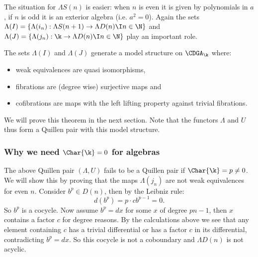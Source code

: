 The situation for $\Lambda S(n)$ is easier: when $n$ is even it is given by polynomials in $a$, if $n$ is odd it is an exterior algebra (i.e. $a^2 = 0$). Again the sets $\Lambda(I) = \{ \Lambda(i_n) : \Lambda S(n+1) \to \Lambda D(n) \I n \in \N\}$ and $\Lambda(J) = \{ \Lambda(j_n) : \k \to \Lambda D(n) \I n \in \N\}$ play an important role.

\begin{theorem}
	The sets $\Lambda(I)$ and $\Lambda(J)$ generate a model structure on $\CDGA_\k$ where:
	\begin{itemize}
		\item weak equivalences are quasi isomorphisms,
		\item fibrations are (degree wise) surjective maps and
		\item cofibrations are maps with the left lifting property against trivial fibrations.
	\end{itemize}
\end{theorem}

We will prove this theorem in the next section. Note that the functors $\Lambda$ and $U$ thus form a Quillen pair with this model structure.

\subsubsection{Why we need $\Char{\k} = 0$ for algebras}
The above Quillen pair $(\Lambda, U)$ fails to be a Quillen pair if $\Char{\k} = p \neq 0$. We will show this by proving that the maps $\Lambda(j_n)$ are not weak equivalences for even $n$. Consider $b^p \in D(n)$, then by the Leibniz rule:
$$ d(b^p) = p \cdot c b^{p-1} = 0. $$
So $b^p$ is a cocycle. Now assume $b^p = d x$ for some $x$ of degree $p n - 1$, then $x$ contains a factor $c$ for degree reasons. By the calculations above we see that any element containing $c$ has a trivial differential or has a factor $c$ in its differential, contradicting $b^p =  d x$. So this cocycle is not a coboundary and $\Lambda D(n)$ is not acyclic.
